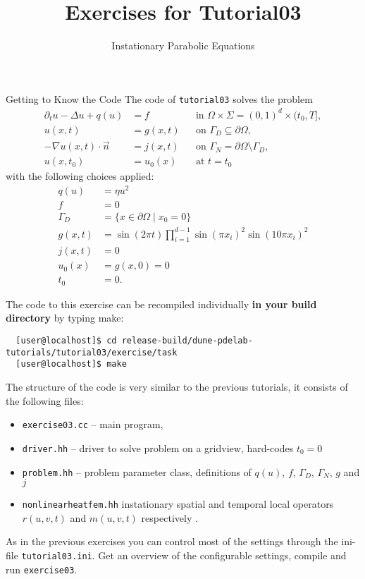 \documentclass[12pt,a4paper]{article}
\title{\textbf{Exercises for Tutorial03}}
\subtitle{Instationary Parabolic Equations}
\begin{document}
\exerciseheader

\begin{Exercise}{Getting to Know the Code}
  \lstset{language=bash}
  The code of \lstinline!tutorial03! solves the problem
  \begin{align}
    \partial_t u-\Delta u+q(u) &= f && \text{in }\Omega\times\Sigma =
    (0,1)^d \times (t_0, T], \\
    u(x,t) & =g(x,t) && \text{on }\Gamma_D\subseteq\partial\Omega, \\
    -\nabla u(x,t) \cdot \vec{n} &= j(x,t) &&
    \text{on }\Gamma_N=\partial\Omega\setminus\Gamma_D, \\
    u(x,t_0)&=u_0(x) && \text{at } t=t_0
  \end{align}
  with the following choices applied:
  \begin{align}
    \label{ch1:first}
    q(u) &= \eta u^2 \\
    f &= 0 \\
    \Gamma_D &= \{x \in\partial\Omega \mid x_0 = 0 \} \\
    g(x,t) &= \sin(2\pi t) \prod_{i=1}^{d-1} \sin(\pi x_i)^2
    \sin(10\pi x_i)^2\\
    j(x,t) &= 0 \\
    u_0(x) &= g(x,0) = 0 \\
    \label{ch1:last}
    t_0&=0 .
  \end{align}

  The code to this exercise can be recompiled individually \textbf{in
    your build directory} by typing make:
  \begin{lstlisting}
  [user@localhost]$ cd release-build/dune-pdelab-tutorials/tutorial03/exercise/task
  [user@localhost]$ make
  \end{lstlisting}

  The structure of the code is very similar to the previous tutorials,
  it consists of the following files:
  \begin{itemize}
  \item \lstinline!exercise03.cc! -- main program,
  \item \lstinline!driver.hh! -- driver to solve problem on a gridview,
    hard-codes $t_0=0$
  \item \lstinline!problem.hh! -- problem parameter class, definitions
    of $q(u)$, $f$, $\Gamma_D$, $\Gamma_N$, $g$ and $j$
  \item \lstinline!nonlinearheatfem.hh! instationary spatial and
    temporal local operators $r(u,v,t)$ and $m(u,v,t)$ respectively .
  \end{itemize}
  As in the previous exercises you can control most of the settings
  through the ini-file \lstinline!tutorial03.ini!. Get an overview of
  the configurable settings, compile and run \lstinline!exercise03!.


\end{Exercise}
\end{document}
